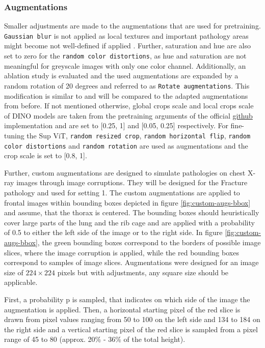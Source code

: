 \subsubsection*{Augmentations}
Smaller adjustments are made to the augmentations that are used for pretraining.
\texttt{Gaussian blur} is not applied as local textures and important pathology areas might become not well-defined if applied \citep{Azizi2021}.
Further, saturation and hue are also set to zero for the \texttt{random color distortions}, as hue and saturation are not meaningful for greyscale images with only one color channel.
Additionally, an ablation study is evaluated and the used augmentations are expanded by a random rotation of 20 degrees and referred to as \texttt{Rotate augmentations}. 
This modification is similar to \citep{Azizi2021} and will be compared to the adapted augmentations from before.
If not mentioned otherwise, global crops scale and local crops scale of DINO models are taken from the pretraining arguments of the official \href{https://github.com/facebookresearch/dino#pretrained-models}{github} implementation and are set to [0.25, 1] and [0.05, 0.25] respectively. 
For fine-tuning the Sup ViT, \texttt{random resized crop}, \texttt{random horizontal flip}, \texttt{random color distortions} and \texttt{random rotation} are used as augmentations and the crop scale is set to [0.8, 1].
\par
Further, custom augmentations are designed to simulate pathologies on chest X-ray images through image corruptions.
They will be designed for the Fracture pathology and used for setting 1.
The custom augmentations are applied to frontal images within bounding boxes depicted in figure \ref{fig:custom-augs-bbox} and assume, that the thorax is centered.
The bounding boxes should heuristically cover large parts of the lung and the rib cage and are applied with a probability of 0.5 to either the left side of the image or to the right side.
In figure \ref{fig:custom-augs-bbox}, the green bounding boxes correspond to the borders of possible image slices, where the image corruption is applied, while the red bounding boxes correspond to samples of image slices.
Augmentations were designed for an image size of $224\times224$ pixels but with adjustments, any square size should be applicable.
\par
First, a probability p is sampled, that indicates on which side of the image the augmentation is applied.
Then, a horizontal starting pixel of the red slice is drawn from pixel values ranging from 50 to 100 on the left side and 134 to 184 on the right side and a vertical starting pixel of the red slice is sampled from a pixel range of 45 to 80 (approx. 20\% - 36\% of the total height).
